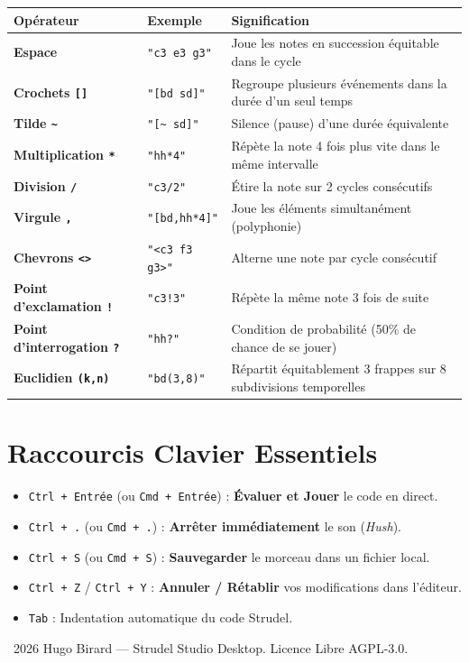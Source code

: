 \documentclass[a4paper,10pt]{article}
\begin{document}
\begin{tabularx}{\linewidth}{|l|l|X|}
\hline
\textbf{Opérateur} & \textbf{Exemple} & \textbf{Signification} \\
\hline
\textbf{Espace} & \texttt{"c3 e3 g3"} & Joue les notes en succession équitable dans le cycle \\
\textbf{Crochets \texttt{[]}} & \texttt{"[bd sd]"} & Regroupe plusieurs événements dans la durée d'un seul temps \\
\textbf{Tilde \texttt{\~}} & \texttt{"[\~{} sd]"} & Silence (pause) d'une durée équivalente \\
\textbf{Multiplication \texttt{*}} & \texttt{"hh*4"} & Répète la note 4 fois plus vite dans le même intervalle \\
\textbf{Division \texttt{/}} & \texttt{"c3/2"} & Étire la note sur 2 cycles consécutifs \\
\textbf{Virgule \texttt{,}} & \texttt{"[bd,hh*4]"} & Joue les éléments simultanément (polyphonie) \\
\textbf{Chevrons \texttt{<>}} & \texttt{"<c3 f3 g3>"} & Alterne une note par cycle consécutif \\
\textbf{Point d'exclamation \texttt{!}} & \texttt{"c3!3"} & Répète la même note 3 fois de suite \\
\textbf{Point d'interrogation \texttt{?}} & \texttt{"hh?"} & Condition de probabilité (50\% de chance de se jouer) \\
\textbf{Euclidien \texttt{(k,n)}} & \texttt{"bd(3,8)"} & Répartit équitablement 3 frappes sur 8 subdivisions temporelles \\
\hline
\end{tabularx}

\section{Raccourcis Clavier Essentiels}
\begin{itemize}
    \item \texttt{Ctrl + Entrée} (ou \texttt{Cmd + Entrée}) : \textbf{Évaluer et Jouer} le code en direct.
    \item \texttt{Ctrl + .} (ou \texttt{Cmd + .}) : \textbf{Arrêter immédiatement} le son (\textit{Hush}).
    \item \texttt{Ctrl + S} (ou \texttt{Cmd + S}) : \textbf{Sauvegarder} le morceau dans un fichier local.
    \item \texttt{Ctrl + Z} / \texttt{Ctrl + Y} : \textbf{Annuler / Rétablir} vos modifications dans l'éditeur.
    \item \texttt{Tab} : Indentation automatique du code Strudel.
\end{itemize}

\vfill
\begin{center}
\small \textcopyright\ 2026 Hugo Birard — Strudel Studio Desktop. Licence Libre AGPL-3.0.
\end{center}
\end{document}
